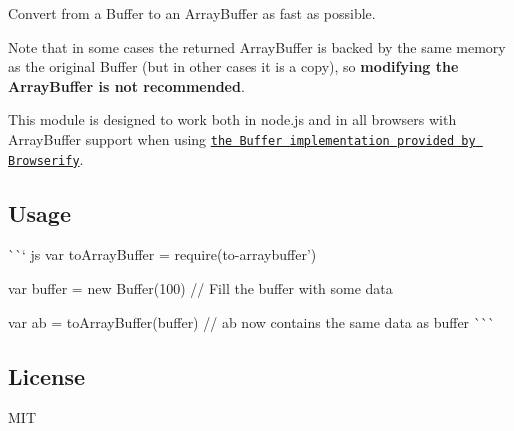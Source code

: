 \href{https://saucelabs.com/u/to-arraybuffer}{\tt }

Convert from a Buffer to an Array\+Buffer as fast as possible.

Note that in some cases the returned Array\+Buffer is backed by the same memory as the original Buffer (but in other cases it is a copy), so {\bfseries modifying the Array\+Buffer is not recommended}.

This module is designed to work both in node.\+js and in all browsers with Array\+Buffer support when using \href{https://www.npmjs.com/package/buffer}{\tt the Buffer implementation provided by Browserify}.

\subsection*{Usage}

\`{}\`{}` js var to\+Array\+Buffer = require(\textquotesingle{}to-\/arraybuffer')

var buffer = new Buffer(100) // Fill the buffer with some data

var ab = to\+Array\+Buffer(buffer) // {\ttfamily ab} now contains the same data as {\ttfamily buffer} \`{}\`{}\`{}

\subsection*{License}

M\+IT 